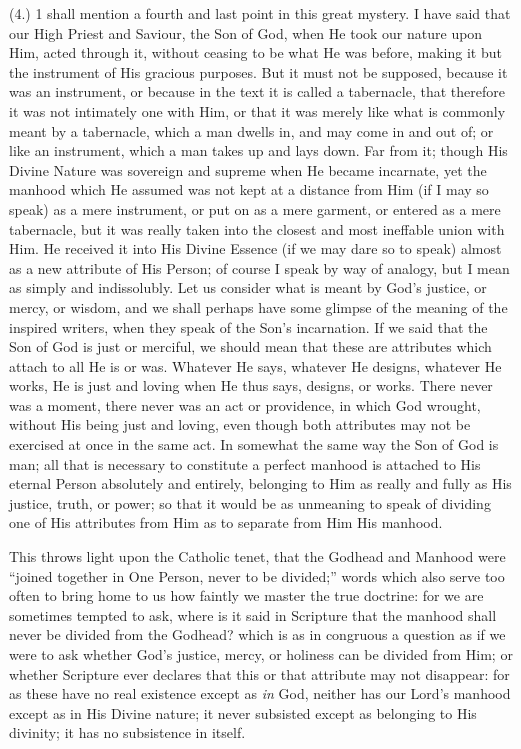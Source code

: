 (4.) 1 shall mention a fourth and last point in this great mystery. I
have said that our High Priest and Saviour, the Son of God, when He took
our nature upon Him, acted through it, without ceasing to be what He was
before, making it but the instrument of His gracious purposes. But it
must not be supposed, because it was an instrument, or because in the
text it is called a tabernacle, that therefore it was not intimately one
with Him, or that it was merely like what is commonly meant by a
tabernacle, which a man dwells in, and may come in and out of; or like
an instrument, which a man takes up and lays down. Far from it; though
His Divine Nature was sovereign and supreme when He became incarnate,
yet the manhood which He assumed was not kept at a distance from Him (if
I may so speak) as a mere instrument, or put on as a mere garment, or
entered as a mere tabernacle, but it was really taken into the closest
and most ineffable union with Him. He received it into His Divine
Essence (if we may dare so to speak) almost as a new attribute of His
Person; of course I speak by way of analogy, but I mean as simply and
indissolubly. Let us consider what is meant by God's justice, or mercy,
or wisdom, and we shall perhaps have some glimpse of the meaning of the
inspired writers, when they speak of the Son's incarnation. If we said
that the Son of God is just or merciful, we should mean that these are
attributes which attach to all He is or was. Whatever He says, whatever
He designs, whatever He works, He is just and loving when He thus says,
designs, or works. There never was a moment, there never was an act or
providence, in which God wrought, without His being just and loving,
even though both attributes may not be exercised at once in the same
act. In somewhat the same way the Son of God is man; all that is
necessary to constitute a perfect manhood is attached to His eternal
Person absolutely and entirely, belonging to Him as really and fully as
His justice, truth, or power; so that it would be as unmeaning to speak
of dividing one of His attributes from Him as to separate from Him His
manhood.

This throws light upon the Catholic tenet, that the Godhead and
Manhood were ``joined together in One Person, never to be
divided;'' words which also serve too often to bring home to us how
faintly we master the true doctrine: for we are sometimes tempted to
ask, where is it said in Scripture that the manhood shall never be
divided from the Godhead? which is as in congruous a question as if we
were to ask whether God's justice, mercy, or holiness can be divided
from Him; or whether Scripture ever declares that this or that attribute
may not disappear: for as these have no real existence except as \emph{in} God,
neither has our Lord's manhood except as in His Divine nature; it never
subsisted except as belonging to His divinity; it has no subsistence in
itself.

